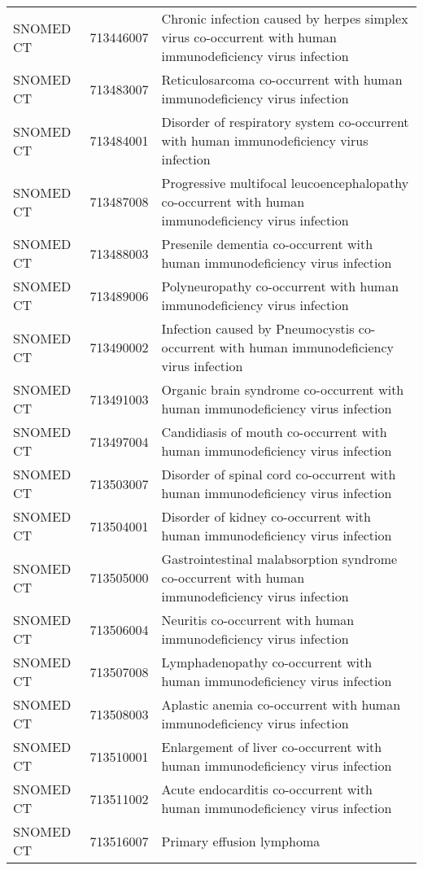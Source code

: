 \begin{longtable}{p{}p{}p{}}
  SNOMED CT & 713446007 & Chronic infection caused by herpes simplex virus co-occurrent with human immunodeficiency virus infection \\ 
  SNOMED CT & 713483007 & Reticulosarcoma co-occurrent with human immunodeficiency virus infection \\ 
  SNOMED CT & 713484001 & Disorder of respiratory system co-occurrent with human immunodeficiency virus infection \\ 
  SNOMED CT & 713487008 & Progressive multifocal leucoencephalopathy co-occurrent with human immunodeficiency virus infection \\ 
  SNOMED CT & 713488003 & Presenile dementia co-occurrent with human immunodeficiency virus infection \\ 
  SNOMED CT & 713489006 & Polyneuropathy co-occurrent with human immunodeficiency virus infection \\ 
  SNOMED CT & 713490002 & Infection caused by Pneumocystis co-occurrent with human immunodeficiency virus infection \\ 
  SNOMED CT & 713491003 & Organic brain syndrome co-occurrent with human immunodeficiency virus infection \\ 
  SNOMED CT & 713497004 & Candidiasis of mouth co-occurrent with human immunodeficiency virus infection \\ 
  SNOMED CT & 713503007 & Disorder of spinal cord co-occurrent with human immunodeficiency virus infection \\ 
  SNOMED CT & 713504001 & Disorder of kidney co-occurrent with human immunodeficiency virus infection \\ 
  SNOMED CT & 713505000 & Gastrointestinal malabsorption syndrome co-occurrent with human immunodeficiency virus infection \\ 
  SNOMED CT & 713506004 & Neuritis co-occurrent with human immunodeficiency virus infection \\ 
  SNOMED CT & 713507008 & Lymphadenopathy co-occurrent with human immunodeficiency virus infection \\ 
  SNOMED CT & 713508003 & Aplastic anemia co-occurrent with human immunodeficiency virus infection \\ 
  SNOMED CT & 713510001 & Enlargement of liver co-occurrent with human immunodeficiency virus infection \\ 
  SNOMED CT & 713511002 & Acute endocarditis co-occurrent with human immunodeficiency virus infection \\ 
  SNOMED CT & 713516007 & Primary effusion lymphoma \\ 

\end{longtable}
